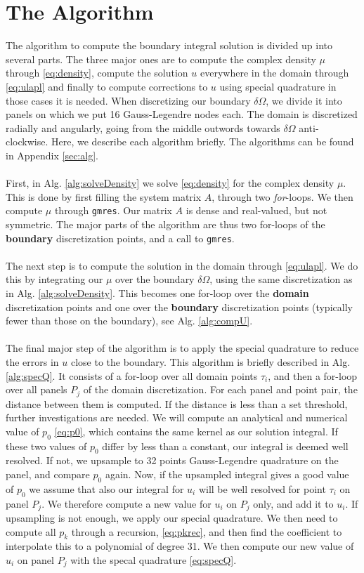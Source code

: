 \documentclass[a4paper,10pt]{article}
\def\code#1{\texttt{#1}}
\begin{document}
\section*{The Algorithm}
The algorithm to compute the boundary integral solution is divided up into several parts. The three major ones are to compute the complex density $\mu$ through \eqref{eq:density}, compute the solution $u$ everywhere in the domain through \eqref{eq:ulapl} and finally to compute corrections to $u$ using special quadrature in those cases it is needed. When discretizing our boundary $\delta\Omega$, we divide it into panels on which we put 16 Gauss-Legendre nodes each. The domain is discretized radially and angularly, going from the middle outwords towards $\delta\Omega$ anti-clockwise. Here, we describe each algorithm briefly. The algorithms can be found in Appendix \ref{sec:alg}. 
\\ \\
First, in Alg. \ref{alg:solveDensity} we solve \eqref{eq:density} for the complex density $\mu$. This is done by first filling the system matrix $A$, through two \textit{for}-loops. We then compute $\mu$ through \code{gmres}. Our matrix $A$ is dense and real-valued, but not symmetric. The major parts of the algorithm are thus two for-loops of the \textbf{boundary} discretization points, and a call to \texttt{gmres}.
\\ \\
The next step is to compute the solution in the domain through \eqref{eq:ulapl}. We do this by integrating our $\mu$ over the boundary $\delta\Omega$, using the same discretization as in Alg. \ref{alg:solveDensity}. This becomes one for-loop over the \textbf{domain} discretization points and one over the \textbf{boundary} discretization points (typically fewer than those on the boundary), see Alg. \ref{alg:compU}.
\\ \\
The final major step of the algorithm is to apply the special quadrature  to reduce the errors in $u$ close to the boundary. This algorithm is briefly described in Alg. \ref{alg:specQ}. It consists of a for-loop over all domain points $\tau_i$, and then a for-loop over all panels $P_j$ of the domain discretization. For each panel and point pair, the distance between them is computed. If the distance is less than a set threshold, further investigations are needed. We will compute an analytical and numerical value of $p_0$ \eqref{eq:p0}, which contains the same kernel as our solution integral. If these two values of $p_0$ differ by less than a constant, our integral is deemed well resolved. If not, we upsample to 32 points Gauss-Legendre quadrature on the panel, and compare $p_0$ again. Now, if the upsampled integral gives a good value of $p_0$ we assume that also our integral for $u_i$ will be well resolved for point $\tau_i$ on panel $P_j$. We therefore compute a new value for $u_i$ on $P_j$ only, and add it to $u_i$. If upsampling is not enough, we apply our special quadrature. We then need to compute all $p_k$ through a recursion, \eqref{eq:pkrec}, and then find the coefficient to interpolate this to a polynomial of degree 31. We then compute our new value of $u_i$ on panel $P_j$ with the specal quadrature \eqref{eq:specQ}. 
\FloatBarrier
\end{document}
